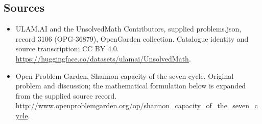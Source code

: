 \documentclass[11pt,a4paper]{article}
\begin{document}
\subsection{Sources}
\begin{itemize}
\item[S1] ULAM.AI and the UnsolvedMath Contributors, supplied problems.json, record 3106 (OPG-36879), OpenGarden collection. Catalogue identity and source transcription; CC BY 4.0.
\url{https://huggingface.co/datasets/ulamai/UnsolvedMath}.
\item[S2] Open Problem Garden, Shannon capacity of the seven-cycle. Original problem and discussion; the mathematical formulation below is expanded from the supplied source record.
\url{http://www.openproblemgarden.org/op/shannon_capacity_of_the_seven_cycle}.
\end{itemize}
\end{document}
